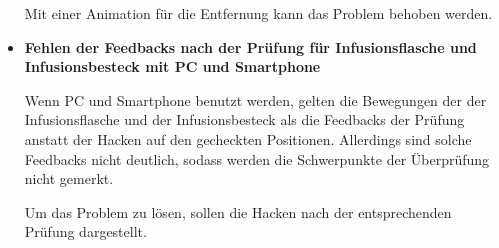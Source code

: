 \begin{itemize}
    Mit einer Animation für die Entfernung kann das Problem behoben werden.
    
    \item \textbf{Fehlen der Feedbacks nach der Prüfung für Infusionsflasche und Infusionsbesteck mit PC und Smartphone}
    
    Wenn PC und Smartphone benutzt werden, gelten die Bewegungen der der Infusionsflasche und der Infusionsbesteck als die Feedbacks der Prüfung anstatt der Hacken auf den gecheckten Positionen. Allerdings sind solche Feedbacks nicht deutlich, sodass werden die Schwerpunkte der Überprüfung nicht gemerkt.
    
    Um das Problem zu lösen, sollen die Hacken nach der entsprechenden Prüfung dargestellt.
\end{itemize}












